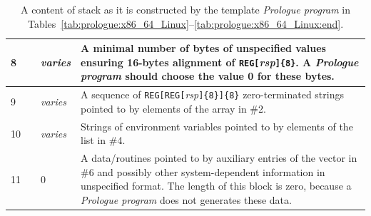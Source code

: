 \documentclass[10pt,twocolumn]{article}
\begin{document}
\begin{table}[!h]
\begin{center}
\begin{tabular}{l||p{3.5cm}|p{3.5cm}|p{7cm}}
8 %
& %
& \textit{varies} %
& A minimal number of bytes of unspecified values ensuring 16-bytes alignment of
\texttt{REG[}\textit{rsp}\texttt{]\{8\}}. A \textit{Prologue program} should
choose the value 0 for these bytes. \\ \hline

9 %
& %
& \textit{varies} %
& A sequence of \texttt{REG[REG[}\textit{rsp}\texttt{]\{8\}]\{8\}}
zero-terminated strings pointed to by elements of the array in \#2.%
\\ \hline

10 %
& %
& \textit{varies} %
& Strings of environment variables pointed to by elements of the list in \#4.%
\\ \hline

11 %
& %
& 0 %
& A data/routines pointed to by auxiliary entries of the vector in \#6 and
possibly other system-dependent information in unspecified format. The length of
this block is zero, because a \textit{Prologue program} does not generates these
data. %
\\ \hline

\end{tabular}
\end{center}
\caption{A content of stack as it is constructed by the template \emph{Prologue
program} in
Tables~\ref{tab:prologue:x86_64_Linux}--\ref{tab:prologue:x86_64_Linux:end}.} %
\label{tab:prologue:x86_64_Linux:stack_structure}
\end{table}

\clearpage


\end{document}
